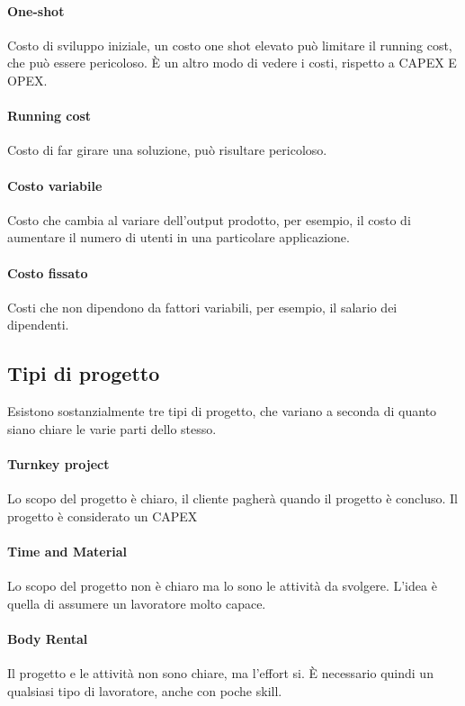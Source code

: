 \paragraph{One-shot}
Costo di sviluppo iniziale, un costo one shot elevato può limitare il running cost, 
che può essere pericoloso.
È un altro modo di vedere i costi, rispetto a CAPEX E OPEX.

\paragraph{Running cost}
Costo di far girare una soluzione, può risultare pericoloso.

\paragraph{Costo variabile}
Costo che cambia al variare dell'output prodotto, per esempio, 
il costo di aumentare il numero di utenti in una particolare applicazione.

\paragraph{Costo fissato}
Costi che non dipendono da fattori variabili, per esempio, il salario dei dipendenti.

\subsection{Tipi di progetto}
Esistono sostanzialmente tre tipi di progetto, che variano a seconda di quanto
siano chiare le varie parti dello stesso.

\paragraph{Turnkey project}
Lo scopo del progetto è chiaro, il cliente pagherà quando il progetto è 
concluso. Il progetto è considerato un CAPEX

\paragraph{Time and Material}
Lo scopo del progetto non è chiaro ma lo sono le attività da svolgere.
L'idea è quella di assumere un lavoratore molto capace.

\paragraph{Body Rental}
Il progetto e le attività non sono chiare, ma l'effort si.
È necessario quindi un qualsiasi tipo di lavoratore, anche con poche skill.

